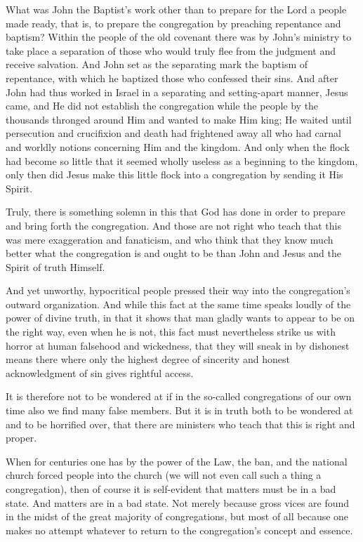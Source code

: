 What was John the Baptist’s work other than to prepare for the Lord a people made ready, that is, to prepare the congregation by preaching repentance and baptism? Within the people of the old covenant there was by John’s ministry to take place a separation of those who would truly flee from the judgment and receive salvation. And John set as the separating mark the baptism of repentance, with which he baptized those who confessed their sins. And after John had thus worked in Israel in a separating and setting-apart manner, Jesus came, and He did not establish the congregation while the people by the thousands thronged around Him and wanted to make Him king; He waited until persecution and crucifixion and death had frightened away all who had carnal and worldly notions concerning Him and the kingdom. And only when the flock had become so little that it seemed wholly useless as a beginning to the kingdom, only then did Jesus make this little flock into a congregation by sending it His Spirit.

Truly, there is something solemn in this that God has done in order to prepare and bring forth the congregation. And those are not right who teach that this was mere exaggeration and fanaticism, and who think that they know much better what the congregation is and ought to be than John and Jesus and the Spirit of truth Himself.

And yet unworthy, hypocritical people pressed their way into the congregation’s outward organization. And while this fact at the same time speaks loudly of the power of divine truth, in that it shows that man gladly wants to appear to be on the right way, even when he is not, this fact must nevertheless strike us with horror at human falsehood and wickedness, that they will sneak in by dishonest means there where only the highest degree of sincerity and honest acknowledgment of sin gives rightful access.

It is therefore not to be wondered at if in the so-called congregations of our own time also we find many false members. But it is in truth both to be wondered at and to be horrified over, that there are ministers who teach that this is right and proper.

When for centuries one has by the power of the Law, the ban, and the national church forced people into the church (we will not even call such a thing a congregation), then of course it is self-evident that matters must be in a bad state. And matters are in a bad state. Not merely because gross vices are found in the midst of the great majority of congregations, but most of all because one makes no attempt whatever to return to the congregation’s concept and essence.

